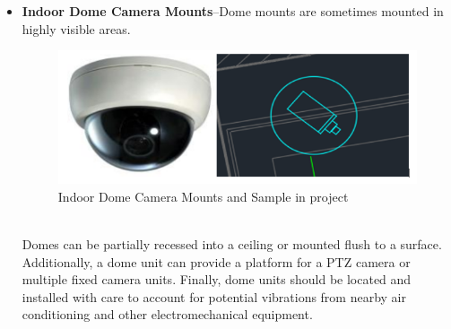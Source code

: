 \documentclass[12pt,fleqn]{book} %
\begin{document}
\begin{enumerate}
\begin{itemize}
           \item \textbf{Indoor Dome Camera Mounts}–Dome mounts are sometimes mounted in highly visible areas. 
    \begin{figure}[!h]
    \centering
    \includegraphics[width=0.5\linewidth]{c 10.png}
    \caption{Indoor Dome Camera Mounts and Sample in project}
    \label{fig:c 10}
    \end{figure}
    \\Domes can be partially recessed into a ceiling or mounted flush to a surface. Additionally, a dome unit can provide a platform for a PTZ camera or multiple fixed camera units. Finally, dome units should be located and installed with care to account for potential vibrations from nearby air conditioning and other electromechanical equipment. 
    \end{itemize}
    

\end{enumerate}
\end{document}
